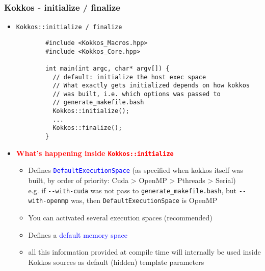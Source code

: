 \begin{frame}[fragile=singleslide]
  \frametitle{Kokkos - initialize / finalize}

  \begin{itemize}
  \item \texttt{Kokkos::initialize / finalize}
    {\small\begin{verbatim}
        #include <Kokkos_Macros.hpp>
        #include <Kokkos_Core.hpp>
        
        int main(int argc, char* argv[]) {
          // default: initialize the host exec space
          // What exactly gets initialized depends on how kokkos
          // was built, i.e. which options was passed to
          // generate_makefile.bash
          Kokkos::initialize();
          ...
          Kokkos::finalize();
        }
      \end{verbatim}
    }
  \item \textcolor{red}{\textbf{What's happening inside \texttt{Kokkos::initialize}}}
    \begin{itemize}
    \item Defines \textcolor{blue}{\texttt{DefaultExecutionSpace}} (as specified when kokkos itself was built, by order of priority: Cuda > OpenMP > Pthreads > Serial)\\
      e.g. if \texttt{\--\--with-cuda} was not pass to \texttt{generate\_makefile.bash}, but \texttt{\--\--with-openmp} was, then \texttt{DefaultExecutionSpace} is OpenMP
    \item You can activated several execution spaces (recommended)
    \item Defines a \textcolor{blue}{default memory space}
    \item all this information provided at compile time will internally be used inside Kokkos sources as default (hidden) template parameters
    \end{itemize}
  \end{itemize}
\end{frame}


